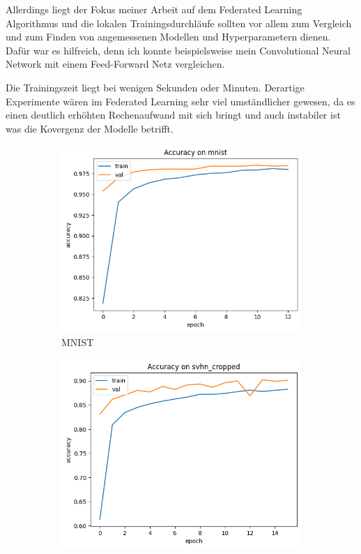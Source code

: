 Allerdings liegt der Fokus meiner Arbeit auf dem Federated Learning Algorithmus und die lokalen Trainingsdurchläufe sollten vor allem zum Vergleich und zum Finden von angemessenen Modellen und Hyperparametern dienen. Dafür war es hilfreich, denn ich konnte beispielsweise mein Convolutional Neural Network mit einem Feed-Forward Netz vergleichen. 

Die Trainingszeit liegt bei wenigen Sekunden oder Minuten. Derartige Experimente wären im Federated Learning sehr viel umständlicher gewesen, da es einen deutlich erhöhten Rechenaufwand mit sich bringt und auch instabiler ist was die Kovergenz der Modelle betrifft.

\begin{figure}
	\centering
	\begin{subfigure}{0.3\textwidth}
		\centering
		\includegraphics[width=\textwidth]{Bilder/mnist-results-local.png}
		\caption{MNIST}
	\end{subfigure}
	\begin{subfigure}{0.3\textwidth}
		\centering
		\includegraphics[width=\textwidth]{Bilder/svhn-results-local.png}

\end{subfigure}
\end{figure}

